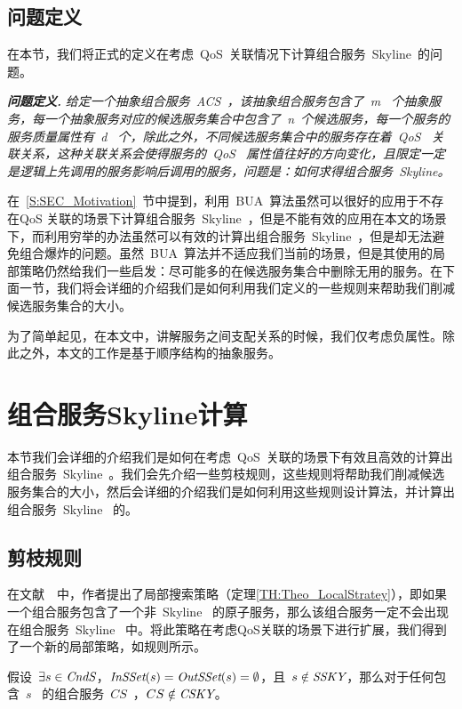 \subsection{问题定义}

在本节，我们将正式的定义在考虑~QoS~关联情况下计算组合服务~Skyline~的问题。

\noindent\textbf{\emph{问题定义.}} \emph{给定一个抽象组合服务~\emph{ACS}~，该抽象组合服务包含了~m~ 个抽象服务，每一个抽象服务对应的候选服务集合中包含了~n~个候选服务，每一个服务的服务质量属性有~d~ 个，除此之外，不同候选服务集合中的服务存在着~\emph{QoS}~ 关联关系，这种关联关系会使得服务的~\emph{QoS}~ 属性值往好的方向变化，且限定一定是逻辑上先调用的服务影响后调用的服务，问题是：如何求得组合服务~Skyline。}

在~\ref{S:SEC_Motivation}~节中提到，利用~BUA~算法虽然可以很好的应用于不存在QoS 关联的场景下计算组合服务~Skyline~，但是不能有效的应用在本文的场景下，而利用穷举的办法虽然可以有效的计算出组合服务~Skyline~，但是却无法避免组合爆炸的问题。虽然~BUA~算法并不适应我们当前的场景，但是其使用的局部策略仍然给我们一些启发：尽可能多的在候选服务集合中删除无用的服务。在下面一节，我们将会详细的介绍我们是如何利用我们定义的一些规则来帮助我们削减候选服务集合的大小。

为了简单起见，在本文中，讲解服务之间支配关系的时候，我们仅考虑负属性。除此之外，本文的工作是基于顺序结构的抽象服务。

\section{组合服务Skyline计算}\label{S:SEC_CSKYCOMPUTING}

本节我们会详细的介绍我们是如何在考虑~QoS~关联的场景下有效且高效的计算出组合服务~Skyline~。我们会先介绍一些剪枝规则，这些规则将帮助我们削减候选服务集合的大小，然后会详细的介绍我们是如何利用这些规则设计算法，并计算出组合服务~Skyline~ 的。

\subsection{剪枝规则}

在文献~\cite{yu2013efficient}~中，作者提出了局部搜索策略（定理\ref{TH:Theo_LocalStratey}），即如果一个组合服务包含了一个非~Skyline~ 的原子服务，那么该组合服务一定不会出现在组合服务~Skyline~ 中。将此策略在考虑QoS关联的场景下进行扩展，我们得到了一个新的局部策略，如规则所示。

\begin{theorem}[局部搜索策略]\label{TH:Theo_MyLocalStratey}

假设~$\exists s \in \emph{CndS}$，$\emph{InSSet}(s)=\emph{OutSSet}(s)=\emptyset$，且~$s \notin \emph{SSKY}$，那么对于任何包含~$s$~ 的组合服务~$CS$~，$CS \notin \emph{CSKY}$。

\end{theorem}

